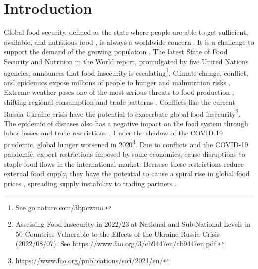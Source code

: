 \documentclass[preprint,3p,times,sort&compress]{elsarticle}
\begin{document}

\section{Introduction}
\label{S1:Introduction}

Global food security, defined as the state where people are able to get sufficient, available, and nutritious food \cite{Barrett-2010-Science,Teeuwen-Meyer-Dou-Nelson-2022-NatFood}, is always a worldwide concern \cite{Rosegrant-Cline-2003-Science,Barrett-2010-Science}. It is a challenge to support the demand of the growing population \cite{Edreira-Andrade-Cassman-vanIttersum-vanLoon-Grassini-2021-NatFood}. The latest State of Food Security and Nutrition in the World report, promulgated by five United Nations agencies, announces that food insecurity is escalating\footnote{\url{See go.nature.com/3bpcwmo.}}. Climate change, conflict, and epidemics expose millions of people to hunger and malnutrition risks \cite{Janssens-Havlik-Krisztin-Baker-Frank-Hasegawa-Leclere-Ohrel-Ragnauth-Schmid-Valin-VanLipzig-Maertens-2020-NatClimChang}. Extreme weather poses one of the most serious threats to food production \cite{Zurek-Hebinck-Selomane-2022-Science}, shifting regional consumption and trade patterns \cite{Janssens-Havlik-Krisztin-Baker-Frank-Hasegawa-Leclere-Ohrel-Ragnauth-Schmid-Valin-VanLipzig-Maertens-2020-NatClimChang}. Conflicts like the current Russia-Ukraine crisis have the potential to exacerbate global food insecurity\footnote{Assessing Food Insecurity in 2022/23 at National and Sub-National Levels in 50 Countries Vulnerable to the Effects of the Ukraine-Russia Crisis (2022/08/07). See \url{https://www.fao.org/3/cb9447en/cb9447en.pdf.}}. The epidemic of diseases also has a negative impact on the food system through labor losses and trade restrictions \cite{Laborde-Martin-Swinnen-Vos-2020-Science}. Under the shadow of the COVID-19 pandemic, global hunger worsened in 2020\footnote{\url{https://www.fao.org/publications/sofi/2021/en/}}. Due to conflicts and the COVID-19 pandemic, export restrictions imposed by some economies, cause disruptions to staple food flows in the international market. Because these restrictions reduce external food supply, they have the potential to cause a spiral rise in global food prices \cite{Bouet-Debucquet-2012-RevWorldEcon}, spreading supply instability to trading partners \cite{Jagermeyr-Robock-Elliott-Muller-Xia-Khabarov-Folberth-Schmid-Liu-Zabel-Rabin-Puma-Heslin-Franke-Foster-Asseng-Bardeen-Toon-Rosenzweig-2020-ProcNatlAcadSciUSA}.
\end{document}
